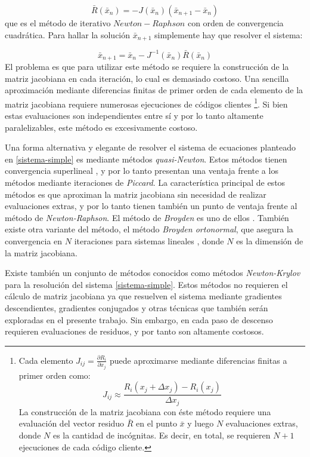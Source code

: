 \begin{equation}
\bar{R}(\bar{x}_n) = -J(\bar{x}_n)(\bar{x}_{n+1}-\bar{x}_n)
\end{equation}
que es el método de iterativo $Newton-Raphson$ con orden de convergencia cuadrática. Para hallar la solución $\bar{x}_{n+1}$ simplemente hay que resolver el sistema:

\begin{equation}
\bar{x}_{n+1} = \bar{x}_{n} -J^{-1}(\bar{x}_n)\bar{R}(\bar{x}_n)
\end{equation}
El problema es que para utilizar este método se requiere la construcción de la matriz jacobiana en cada iteración, lo cual es demasiado costoso.
Una sencilla aproximación mediante diferencias finitas de primer orden de cada elemento de la matriz jacobiana requiere numerosas ejecuciones de códigos clientes
\footnote{
Cada elemento $J_{ij}=\frac{\partial R_i}{\partial x_j}$ puede aproximarse mediante diferencias finitas a primer orden como:
\begin{equation}
J_{ij} \approx \frac{R_i(x_j + \Delta x_j) - R_i(x_j)}{\Delta x_j}
\end{equation}
La construcción de la matriz jacobiana con éste método requiere una evaluación del vector residuo $\bar{R}$ en el punto $\bar{x}$ y luego $N$ evaluaciones extras, donde $N$ es la cantidad de incógnitas. Es decir, en total, se requieren $N+1$ ejecuciones de cada código cliente.
}.
Si bien estas evaluaciones son independientes entre sí y por lo tanto altamente paralelizables, este método es excesivamente costoso.

Una forma alternativa y elegante de resolver el sistema de ecuaciones planteado en \ref{sistema-simple} es mediante métodos \textit{quasi-Newton}.
Estos métodos tienen convergencia superlineal \cite{broyden-on}, y por lo tanto presentan una ventaja frente a los métodos mediante iteraciones de \textit{Piccard}. 
La característica principal de estos métodos es que aproximan la matriz jacobiana sin necesidad de realizar evaluaciones extras, y por lo tanto tienen también un punto de ventaja frente al método de \textit{Newton-Raphson}.
El método de \textit{Broyden} es uno de ellos \cite{broyden}.
También existe otra variante del método, el método \textit{Broyden ortonormal}, que asegura la convergencia en $N$ iteraciones para sistemas lineales \cite{broyden-on}, donde $N$ es la dimensión de la matriz jacobiana.

Existe también un conjunto de métodos conocidos como métodos \textit{Newton-Krylov} para la resolución del sistema \ref{sistema-simple}. Estos métodos no requieren el cálculo de matriz jacobiana ya que resuelven el sistema mediante gradientes descendientes, gradientes conjugados y otras técnicas que también serán exploradas en el presente trabajo. Sin embargo, en cada paso de descenso requieren evaluaciones de residuos, y por tanto son altamente costosos.

